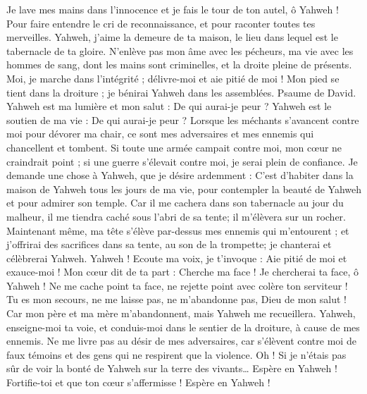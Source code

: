 \begin{multicols}{2}
Je lave mes mains dans l'innocence et je fais le tour de ton autel, ô Yahweh !
Pour faire entendre le cri de reconnaissance, et pour raconter toutes tes merveilles.
Yahweh, j'aime la demeure de ta maison, le lieu dans lequel est le tabernacle de ta gloire.
N'enlève pas mon âme avec les pécheurs, ma vie avec les hommes de sang,
dont les mains sont criminelles, et la droite pleine de présents.
Moi, je marche dans l'intégrité ; délivre-moi et aie pitié de moi !
Mon pied se tient dans la droiture ; je bénirai Yahweh dans les assemblées.
\VerseOne{}Psaume de David. Yahweh est ma lumière et mon salut : De qui aurai-je peur ? Yahweh est le soutien de ma vie : De qui aurai-je peur ?
Lorsque les méchants s'avancent contre moi pour dévorer ma chair, ce sont mes adversaires et mes ennemis qui chancellent et tombent.
Si toute une armée campait contre moi, mon cœur ne craindrait point ; si une guerre s'élevait contre moi, je serai plein de confiance.
Je demande une chose à Yahweh, que je désire ardemment : C'est d'habiter dans la maison de Yahweh tous les jours de ma vie, pour contempler la beauté de Yahweh et pour admirer son temple.
Car il me cachera dans son tabernacle au jour du malheur, il me tiendra caché sous l'abri de sa tente; il m'élèvera sur un rocher.
Maintenant même, ma tête s'élève par-dessus mes ennemis qui m'entourent ; et j'offrirai des sacrifices dans sa tente, au son de la trompette; je chanterai et célèbrerai Yahweh.
Yahweh ! Ecoute ma voix, je t'invoque : Aie pitié de moi et exauce-moi !
Mon cœur dit de ta part : Cherche ma face ! Je chercherai ta face, ô Yahweh !
Ne me cache point ta face, ne rejette point avec colère ton serviteur ! Tu es mon secours, ne me laisse pas, ne m'abandonne pas, Dieu de mon salut !
Car mon père et ma mère m'abandonnent, mais Yahweh me recueillera.
Yahweh, enseigne-moi ta voie, et conduis-moi dans le sentier de la droiture, à cause de mes ennemis.
Ne me livre pas au désir de mes adversaires, car s'élèvent contre moi de faux témoins et des gens qui ne respirent que la violence.
Oh ! Si je n'étais pas sûr de voir la bonté de Yahweh sur la terre des vivants…
Espère en Yahweh ! Fortifie-toi et que ton cœur s'affermisse ! Espère en Yahweh !

\end{multicols}
